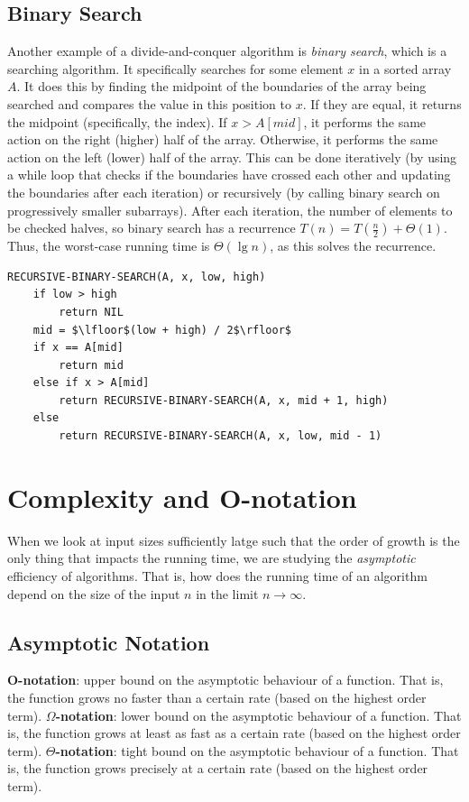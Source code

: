\documentclass[12pt]{article}
\begin{document}
\subsection{Binary Search}
Another example of a divide-and-conquer algorithm is \textit{binary search}, which is a searching algorithm.
It specifically searches for some element $x$ in a sorted array $A$. It does this by finding the midpoint of the
boundaries of the array being searched and compares the value in this position to $x$. If they are equal, it returns
the midpoint (specifically, the index). If $x > A[mid]$, it performs the same action on the right (higher) half of the array.
Otherwise, it performs the same action on the left (lower) half of the array. This can be done iteratively (by using a while loop
that checks if the boundaries have crossed each other and updating the boundaries after each iteration) or recursively (by calling binary
search on progressively smaller subarrays). After each iteration, the number of elements to be checked halves, so binary search has a
recurrence $T(n) = T(\frac{n}{2}) + \Theta(1)$. Thus, the worst-case running time is $\Theta(\lg n)$, as this solves the recurrence.
\begin{lstlisting}[mathescape]
    RECURSIVE-BINARY-SEARCH(A, x, low, high)
    if low > high
        return NIL
    mid = $\lfloor$(low + high) / 2$\rfloor$
    if x == A[mid]
        return mid
    else if x > A[mid]
        return RECURSIVE-BINARY-SEARCH(A, x, mid + 1, high)
    else
        return RECURSIVE-BINARY-SEARCH(A, x, low, mid - 1)
\end{lstlisting}

\section{Complexity and O-notation}
When we look at input sizes sufficiently latge such that the order of growth is the only thing that impacts
the running time, we are studying the \textit{asymptotic} efficiency of algorithms. That is, how does the
running time of an algorithm depend on the size of the input $n$ in the limit $n \rightarrow \infty$.

\subsection{Asymptotic Notation}
\textbf{O-notation}: upper bound on the asymptotic behaviour of a function. That is, the function grows
no faster than a certain rate (based on the highest order term).
\newline \textbf{$\Omega$-notation}: lower bound on the asymptotic behaviour of a function. That is, the function grows
at least as fast as a certain rate (based on the highest order term).
\newline \textbf{$\Theta$-notation}: tight bound on the asymptotic behaviour of a function. That is, the function grows
precisely at a certain rate (based on the highest order term).
\end{document}
